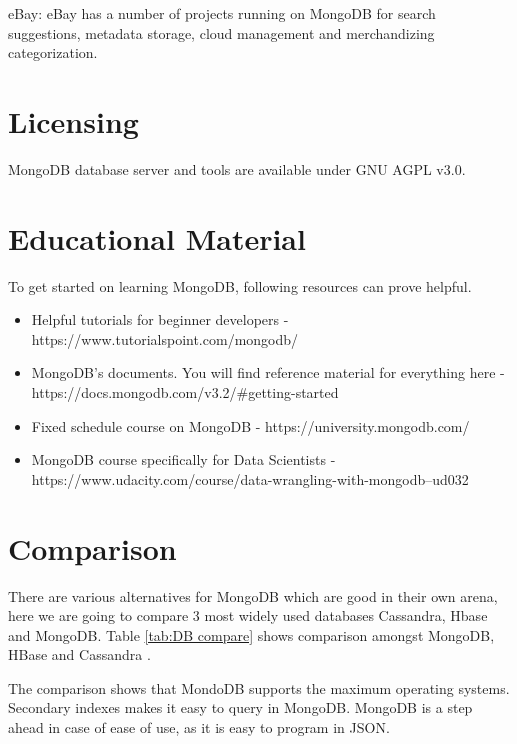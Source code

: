 \documentclass[9pt,twocolumn,twoside]{../../styles/osajnl}
\begin{document}
eBay: eBay has a number of projects running on MongoDB for search suggestions, metadata storage, cloud management and merchandizing categorization.

\section{Licensing}

MongoDB database server and tools are available under GNU AGPL v3.0.

\section{Educational Material}

To get started on learning MongoDB, following resources can prove helpful.

\begin{itemize}
\item Helpful tutorials for beginner developers - https://www.tutorialspoint.com/mongodb/

\item MongoDB's documents. You will find reference material for everything here - https://docs.mongodb.com/v3.2/\#getting-started

\item Fixed schedule course on MongoDB - https://university.mongodb.com/

\item MongoDB course specifically for Data Scientists - https://www.udacity.com/course/data-wrangling-with-mongodb--ud032

\end{itemize}

\section{Comparison}

There are various alternatives for MongoDB which are good in their own arena, here we are going to compare 3 most widely used databases Cassandra, Hbase and MongoDB. Table \ref{tab:DB compare} shows comparison amongst MongoDB, HBase and Cassandra \cite{www-mongo10}. 

The comparison shows that MondoDB supports the maximum operating systems. Secondary indexes makes it easy to query in MongoDB. MongoDB is a step ahead in case of ease of use, as it is easy to program in JSON. 
\end{document}
